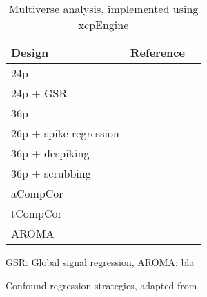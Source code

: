 \begin{table}[bt]
\begin{threeparttable}
\begin{subtable}[t]{.425\textwidth}
            \begin{tabularx}{\textwidth}{l l l}
                \toprule
                \textbf{Design}        & \textbf{Reference}                 \\
                \midrule
                24p                    & \cite{friston1996movement}         \\
                24p + GSR              & \cite{macey2004method}             \\
                36p                    & \cite{satterthwaite2013improved}   \\
                26p + spike regression & \cite{cox1996afni}                 \\
                36p + despiking        & \cite{satterthwaite2013improved}   \\
                36p + scrubbing        & \cite{power2014methods}            \\
                aCompCor               & \cite{muschelli2014reduction}      \\
                tCompCor               & \cite{behzadi2007component}        \\
                AROMA                  & \cite{pruim2015ica}                \\
                \bottomrule
            \end{tabularx}
            \begin{tablenotes}
                \item GSR: Global signal regression, AROMA: bla
            \end{tablenotes}
            \caption{Confound regression strategies, adapted from \citep{Ciric2017-cl}}
        \end{subtable}
        \makeatletter\def\TPT@hsize{}\makeatletter
    \end{threeparttable}
    \caption{Multiverse analysis, implemented using xcpEngine \citep{ciric2018mitigating}}
    \label{tab:multiverse}
\end{table}